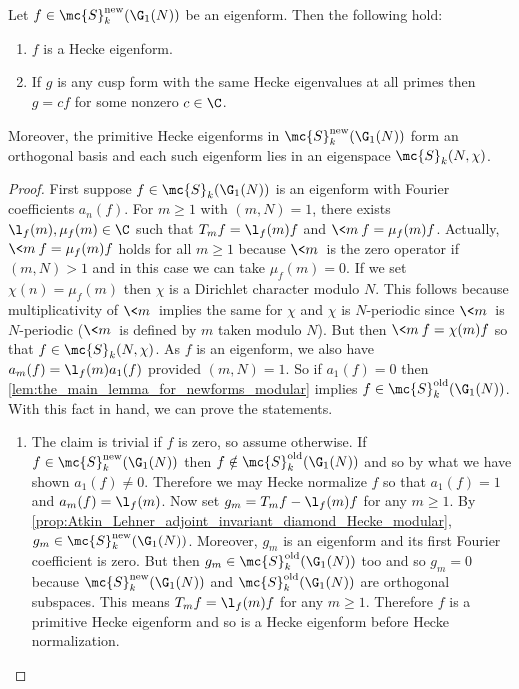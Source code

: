 \documentclass[12pt]{article}
\begin{document}
      \begin{theorem}\label{thm:newforms_characterization_modular}
        Let \(f \in \mc{S}_{k}^{\mathrm{new}}(\G_{1}(N))\) be an eigenform. Then the following hold:
        \begin{enumerate}[label*=(\roman*)]
          \item \(f\) is a Hecke eigenform.
          \item If \(g\) is any cusp form with the same Hecke eigenvalues at all primes then \(g = cf\) for some nonzero \(c \in \C\).
        \end{enumerate}
        Moreover, the primitive Hecke eigenforms in \(\mc{S}_{k}^{\mathrm{new}}(\G_{1}(N))\) form an orthogonal basis and each such eigenform lies in an eigenspace \(\mc{S}_{k}(N,\chi)\).
      \end{theorem}
      \begin{proof}
        First suppose \(f \in \mc{S}_{k}(\G_{1}(N))\) is an eigenform with Fourier coefficients \(a_{n}(f)\). For \(m \ge 1\) with \((m,N) = 1\), there exists \(\l_{f}(m),\mu_{f}(m) \in \C\) such that \(T_{m}f = \l_{f}(m)f\) and \(\<m\>f = \mu_{f}(m)f\). Actually, \(\<m\>f = \mu_{f}(m)f\) holds for all \(m \ge 1\) because \(\<m\>\) is the zero operator if \((m,N) > 1\) and in this case we can take \(\mu_{f}(m) = 0\). If we set \(\chi(n) = \mu_{f}(m)\) then \(\chi\) is a Dirichlet character modulo \(N\). This follows because multiplicativity of \(\<m\>\) implies the same for \(\chi\) and \(\chi\) is \(N\)-periodic since \(\<m\>\) is \(N\)-periodic (\(\<m\>\) is defined by \(m\) taken modulo \(N\)). But then \(\<m\>f = \chi(m)f\) so that \(f \in \mc{S}_{k}(N,\chi)\). As \(f\) is an eigenform, we also have \(a_{m}(f) = \l_{f}(m)a_{1}(f)\) provided \((m,N) = 1\). So if \(a_{1}(f) = 0\) then \cref{lem:the_main_lemma_for_newforms_modular} implies \(f \in \mc{S}_{k}^{\mathrm{old}}(\G_{1}(N))\). With this fact in hand, we can prove the statements.
        \begin{enumerate}[label*=(\roman*)]
          \item The claim is trivial if \(f\) is zero, so assume otherwise. If \(f \in \mc{S}_{k}^{\mathrm{new}}(\G_{1}(N))\) then \(f \notin \mc{S}_{k}^{\mathrm{old}}(\G_{1}(N))\) and so by what we have shown \(a_{1}(f) \neq 0\). Therefore we may Hecke normalize \(f\) so that \(a_{1}(f) = 1\) and \(a_{m}(f) = \l_{f}(m)\). Now set \(g_{m} = T_{m}f-\l_{f}(m)f\) for any \(m \ge 1\). By \cref{prop:Atkin_Lehner_adjoint_invariant_diamond_Hecke_modular}, \(g_{m} \in \mc{S}_{k}^{\mathrm{new}}(\G_{1}(N))\). Moreover, \(g_{m}\) is an eigenform and its first Fourier coefficient is zero. But then \(g_{m} \in \mc{S}_{k}^{\mathrm{old}}(\G_{1}(N))\) too and so \(g_{m} = 0\) because \(\mc{S}_{k}^{\mathrm{new}}(\G_{1}(N))\) and \(\mc{S}_{k}^{\mathrm{old}}(\G_{1}(N))\) are orthogonal subspaces. This means \(T_{m}f = \l_{f}(m)f\) for any \(m \ge 1\). Therefore \(f\) is a primitive Hecke eigenform and so is a Hecke eigenform before Hecke normalization.

\end{enumerate}
\end{proof}
\end{document}
